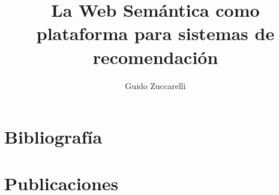 \documentclass[10pt]{report}
\title{La Web Semántica como plataforma para sistemas de recomendación}
\author{Guido Zuccarelli}
\begin{document}
\maketitle

\tableofcontents



















	







\chapter{Bibliografía}



\appendix
\label{anexo}

\chapter{Publicaciones}
\end{document}
